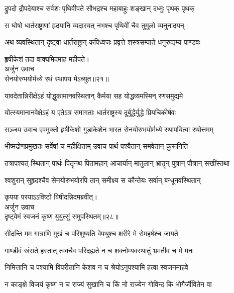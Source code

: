 \twolineshloka
{द्रुपदो द्रौपदेयाश्च सर्वशः पृथिवीपते}
{सौभद्रश्च महाबाहुः शङ्खान् दध्मुः पृथक् पृथक्}%

\twolineshloka
{स घोषो धार्तराष्ट्राणां हृदयानि व्यदारयत्}
{नभश्च पृथिवीं चैव तुमुलो व्यनुनादयन्}%

\twolineshloka
{अथ व्यवस्थितान् दृष्ट्वा धार्तराष्ट्रान् कपिध्वजः}
{प्रवृत्ते शस्त्रसम्पाते धनुरुद्यम्य पाण्डवः}%


{हृषीकेशं तदा वाक्यमिदमाह महीपते।}\\
{अर्जुन उवाच}\\
{सेनयोरुभयोर्मध्ये रथं स्थापय मेऽच्युत॥२१॥}\\%

\twolineshloka
{यावदेतान्निरीक्षेऽहं योद्धुकामानवस्थितान्}
{कैर्मया सह योद्धव्यमस्मिन् रणसमुद्यमे}%

\twolineshloka
{योत्स्यमानानवेक्षेऽहं य एतेऽत्र समागताः}
{धार्तराष्ट्रस्य दुर्बुद्धेर्युद्धे प्रियचिकीर्षवः}%

{सञ्जय उवाच}
\twolineshloka
{एवमुक्तो हृषीकेशो गुडाकेशेन भारत}
{सेनयोरुभयोर्मध्ये स्थापयित्वा रथोत्तमम्}%

\twolineshloka
{भीष्मद्रोणप्रमुखतः सर्वेषां च महीक्षिताम्}
{उवाच पार्थ पश्यैतान् समवेतान् कुरूनिति}%

\twolineshloka
{तत्रापश्यत् स्थितान् पार्थः पितॄनथ पितामहान्}
{आचार्यान् मातुलान् भ्रातॄन् पुत्रान् पौत्रान् सखींस्तथा}%

\twolineshloka
{श्वशुरान् सुहृदश्चैव सेनयोरुभयोरपि}
{तान् समीक्ष्य स कौन्तेयः सर्वान् बन्धूनवस्थितान्}%

{कृपया परयाऽऽविष्टो विषीदन्निदमब्रवीत्।}\\
{अर्जुन उवाच}\\
{दृष्ट्वेमं स्वजनं कृष्ण युयुत्सुं समुपस्थितम्॥२८॥}%

\twolineshloka
{सीदन्ति मम गात्राणि मुखं च परिशुष्यति}
{वेपथुश्च शरीरे मे रोमहर्षश्च जायते}%

\twolineshloka
{गाण्डीवं स्रंसते हस्तात् त्वक्चैव परिदह्यते}
{न च शक्नोम्यवस्थातुं भ्रमतीव च मे मनः}%

\twolineshloka
{निमित्तानि च पश्यामि विपरीतानि केशव}
{न च श्रेयोऽनुपश्यामि हत्वा स्वजनमाहवे}%

\twolineshloka
{न काङ्क्षे विजयं कृष्ण न च राज्यं सुखानि च}
{किं नो राज्येन गोविन्द किं भोगैर्जीवितेन वा}%

